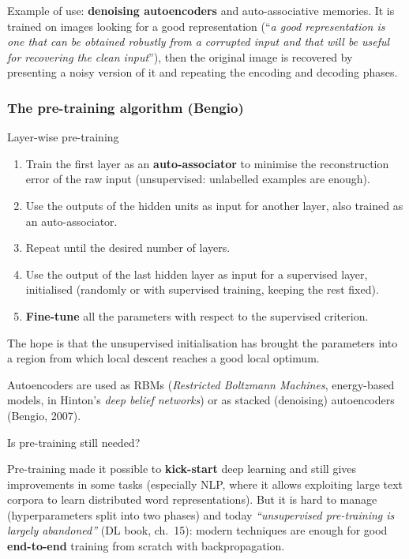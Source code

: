 Example of use: \textbf{denoising autoencoders} and auto-associative
memories. It is trained on images looking for a good representation
(``\emph{a good representation is one that can be obtained robustly
from a corrupted input and that will be useful for recovering the clean
input}''), then the original image is recovered by presenting a noisy
version of it and repeating the encoding and decoding phases.

\subsubsection{The pre-training algorithm
(Bengio)}\label{lalgoritmo-di-pre-training-bengio}

\begin{boxabstract}{Layer-wise pre-training}

\begin{enumerate}
\def\labelenumi{\arabic{enumi}.}
\tightlist
\item
  Train the first layer as an \textbf{auto-associator} to minimise the
  reconstruction error of the raw input (unsupervised: unlabelled
  examples are enough).
\item
  Use the outputs of the hidden units as input for another layer, also
  trained as an auto-associator.
\item
  Repeat until the desired number of layers.
\item
  Use the output of the last hidden layer as input for a supervised
  layer, initialised (randomly or with supervised training, keeping the
  rest fixed).
\item
  \textbf{Fine-tune} all the parameters with respect to the supervised
  criterion.
\end{enumerate}

The hope is that the unsupervised initialisation has brought the
parameters into a region from which local descent reaches a good local
optimum.

\end{boxabstract}

Autoencoders are used as RBMs (\emph{Restricted Boltzmann Machines},
energy-based models, in Hinton's \emph{deep belief networks}) or as
stacked (denoising) autoencoders (Bengio, 2007).

\begin{boxnote}{Is pre-training still needed?}

Pre-training made it possible to \textbf{kick-start} deep learning and
still gives improvements in some tasks (especially NLP, where it allows
exploiting large text corpora to learn distributed word
representations). But it is hard to manage (hyperparameters split into
two phases) and today \emph{``unsupervised pre-training is largely
abandoned''} (DL book, ch.\ 15): modern techniques are enough for good
\textbf{end-to-end} training from scratch with backpropagation.

\end{boxnote}

